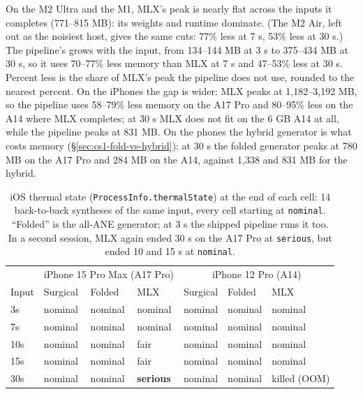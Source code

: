 \documentclass[11pt]{article}
\newcommand{\code}[1]{\texttt{#1}}
\begin{document}
On the M2 Ultra and the M1, MLX's peak is nearly flat across the inputs it completes (771--815 MB): its weights and runtime dominate. (The M2 Air, left out as the noisiest host, gives the same cuts: 77\% less at 7 s, 53\% less at 30 s.) The pipeline's grows with the input, from 134--144 MB at 3 s to 375--434 MB at 30 s, so it uses 70--77\% less memory than MLX at 7 s and 47--53\% less at 30 s. Percent less is the share of MLX's peak the pipeline does not use, rounded to the nearest percent. On the iPhones the gap is wider: MLX peaks at 1,182--3,192 MB, so the pipeline uses 58--79\% less memory on the A17 Pro and 80--95\% less on the A14 where MLX completes; at 30 s MLX does not fit on the 6 GB A14 at all, while the pipeline peaks at 831 MB. On the phones the hybrid generator is what costs memory (\S\ref{sec:cs1-fold-vs-hybrid}): at 30 s the folded generator peaks at 780 MB on the A17 Pro and 284 MB on the A14, against 1,338 and 831 MB for the hybrid.

\begin{table}[h]
\centering
\small
\caption{iOS thermal state (\code{ProcessInfo.thermalState}) at the end of each cell: 14 back-to-back syntheses of the same input, every cell starting at \code{nominal}. ``Folded'' is the all-ANE generator; at 3 s the shipped pipeline runs it too. In a second session, MLX again ended 30 s on the A17 Pro at \code{serious}, but ended 10 and 15 s at \code{nominal}.}
\label{tab:cs1-thermal}
\begin{tabular}{lllllll}
\toprule
 & \multicolumn{3}{c}{iPhone 15 Pro Max (A17 Pro)} & \multicolumn{3}{c}{iPhone 12 Pro (A14)} \\
Input & Surgical & Folded & MLX & Surgical & Folded & MLX \\
\midrule
3s  & nominal & nominal & nominal & nominal & nominal & nominal \\
7s  & nominal & nominal & nominal & nominal & nominal & nominal \\
10s & nominal & nominal & fair & nominal & nominal & nominal \\
15s & nominal & nominal & fair & nominal & nominal & nominal \\
30s & nominal & nominal & \textbf{serious} & nominal & nominal & killed (OOM) \\
\bottomrule
\end{tabular}
\end{table}
\end{document}
